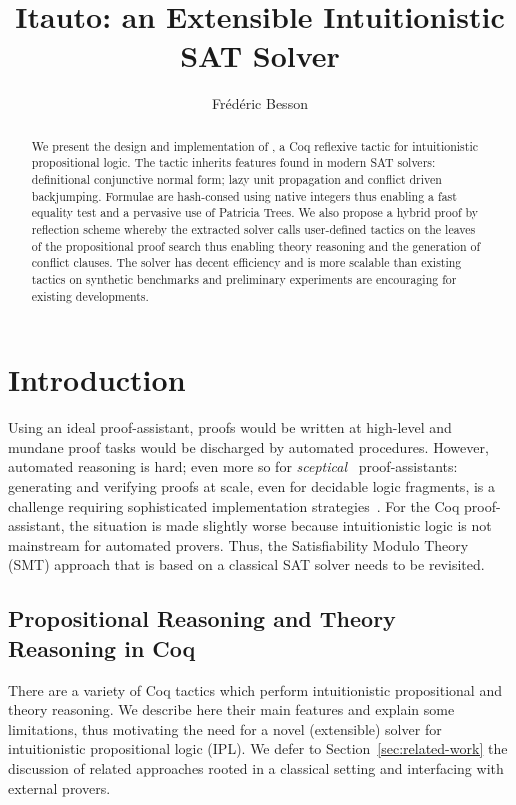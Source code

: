 \documentclass[utf8,a4paper,UKenglish,cleveref, autoref, thm-restate]{lipics-v2021}
\title{Itauto: an Extensible Intuitionistic SAT Solver}
\author{Frédéric Besson}
{Inria, Univ Rennes, Irisa\and Rennes, France}
{frederic.besson@inria.fr}{https://orcid.org/0000-0001-6815-0652}{}
\begin{document}
\maketitle

\begin{abstract}
  We present the design and implementation of , a Coq
  reflexive tactic for intuitionistic propositional logic. The
  tactic inherits features found in modern SAT solvers: definitional
  conjunctive normal form; lazy unit propagation and conflict driven
  backjumping.
  Formulae are hash-consed using native integers thus enabling a
  fast equality test and a pervasive use of Patricia Trees.
  We also propose a hybrid proof by reflection scheme whereby the
  extracted solver calls user-defined tactics on the leaves of the
  propositional proof search thus enabling theory reasoning and the
  generation of conflict clauses.
  The solver has decent efficiency and is more scalable than existing
  tactics on synthetic benchmarks and preliminary experiments are
  encouraging for existing developments.
\end{abstract}


\section{Introduction}
\label{sec:intro}
Using an ideal proof-assistant, proofs would be written at high-level
and mundane proof tasks would be discharged by automated procedures.
%
However, automated reasoning is hard; even more so for
\emph{sceptical}~\cite{HarrisonT98} proof-assistants: generating and
verifying proofs at scale, even for decidable logic fragments, is a
challenge requiring sophisticated implementation strategies~\cite{BohmeW10,BessonCP11,ArmandFGKTW11}.
%
For the Coq proof-assistant, the situation is made slightly worse
because intuitionistic logic is not mainstream for automated provers.
Thus, the Satisfiability Modulo Theory (SMT) approach that is based on a
classical SAT solver needs to be revisited. 

\subsection{Propositional Reasoning and Theory Reasoning in Coq}
\label{sec:prop-in-coq}

There are a variety of Coq tactics which perform intuitionistic
propositional and theory reasoning. We describe here their main
features and explain some limitations, thus motivating the need for a
novel (extensible) solver for intuitionistic propositional logic
(IPL). We defer to Section~\ref{sec:related-work} the discussion of
related approaches rooted in a classical setting and interfacing with
external provers.
\end{document}
